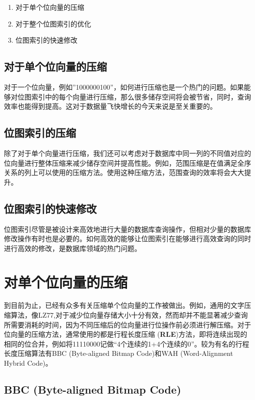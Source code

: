 \documentclass[11pt, a4paper]{article}
\begin{document}
  \begin{enumerate}[1.]
  \item 对于单个位向量的压缩
  \item 对于整个位图索引的优化
  \item 位图索引的快速修改
  \end{enumerate}


  \subsection{对于单个位向量的压缩}

  对于一个位向量，例如''1000000100''，如何进行压缩也是一个热门的问题。如果能够对位图索引中的每个向量进行压缩，那么很多储存空间将会被节省，同时，查询效率也能得到提高。这对于数据量飞快增长的今天来说是至关重要的。\cite{art6}

  \subsection{位图索引的压缩}

  除了对于单个向量进行压缩，我们还可以考虑对于数据库中同一列的不同值对应的位向量进行整体压缩来减少储存空间并提高性能。例如，范围压缩是在值满足全序关系的列上可以使用的压缩方法。使用这种压缩方法，范围查询的效率将会大大提升。

  \subsection{位图索引的快速修改}

  位图索引尽管是被设计来高效地进行大量的数据库查询操作，但相对少量的数据库修改操作有时也是必要的。如何高效的能够让位图索引在能够进行高效查询的同时进行高效的修改，是数据库领域的热门问题。

  \section{对单个位向量的压缩}

  到目前为止，已经有众多有关压缩单个位向量的工作被做出。例如，通用的文字压缩算法，像LZ77,对于减少位向量存储大小十分有效，然而却并不能显著减少查询所需要消耗的时间，因为不同压缩后的位向量进行位操作前必须进行解压缩。对于位向量的压缩方法，通常使用的都是行程长度压缩 ({\bf RLE})方法，即将连续出现的相同的位合并，例如将11110000记做“4个连续的1+4个连续的0”。较为有名的行程长度压缩算法有BBC (Byte-aligned Bitmap Code)和WAH (Word-Alignment Hybrid Code)。

  \subsection{BBC (Byte-aligned Bitmap Code)}
\end{document}
